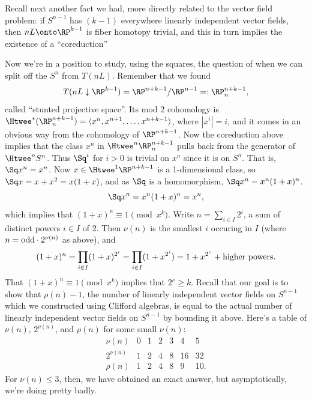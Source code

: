 Recall next another fact we had, more directly related to the vector field problem: if $S^{n-1}$ has $(k-1)$ everywhere linearly independent vector fields, then $nL \onto \RP^{k-1}$ is fiber homotopy trivial, and this in turn implies the existence of a ``coreduction''
Now we're in a position to study, using the squares, the question of when we can split off the $S^n$ from $T(nL)$.  Remember that we found
\[
T(nL\downarrow\RP^{k-1}) = \RP^{n+k-1}/\RP^{n-1} =: \RP^{n+k-1}_n
,\]
called ``stunted projective space''.  Its mod 2 cohomology is $\Htwee^*(\RP^{n+k-1}_n) = \langle x^n, x^{n+1}, \ldots, x^{n+k-1} \rangle$, where $|x^i| = i$, and it comes in an obvious way from the cohomology of $\RP^{n+k-1}$.  Now the coreduction above implies that the class $x^n$ in $\Htwee^n \RP^{n+k-1}_n$ pulls back from the generator of $\Htwee^n S^n$.  Thus $\Sq^i$ for $i > 0$ is trivial on $x^n$ since it is on $S^n$. That is, $\Sq x^n=x^n$.  Now $x \in \Htwee^1 \RP^{n+k-1}$ is a 1-dimensional class, so $\Sq x = x + x^2 = x(1+x)$, and as $\Sq$ is a homomorphism, $\Sq x^n = x^n(1+x)^n$. %
\[
\Sq x^n = x^n(1 + x)^n = x^n
,\]
which implies that $(1+x)^n \equiv 1 \pmod{x^k}$.  Write $n = \sum_{i \in I} 2^i$, a sum of distinct powers $i \in I$ of 2.  Then $\nu(n)$ is the smallest $i$ occuring in $I$ (where $n=\textup{odd}\cdot2^{\nu(n)}$ as above), and
\[
(1+x)^n = \prod_{i \in I} (1 + x)^{2^i} = \prod_{i \in I} (1 + x^{2^i}) = 1 + x^{2^\nu} + \hbox{higher powers}
.\]
That $(1 + x)^n \equiv 1 \pmod{x^k}$ implies that $2^\nu \ge k$.  Recall that our goal is to show that $\rho(n) - 1$, the number of linearly independent vector fields on $S^{n-1}$ which we constructed using Clifford algebras, is equal to the actual number of linearly independent vector fields on $S^{n-1}$ by bounding it above.  Here's a table of $\nu(n)$, $2^{\nu(n)}$, and $\rho(n)$ for some small $\nu(n)$:
\[
\begin{array}{c|cccccc}
\nu(n) & 0 & 1 & 2 & 3 & 4 & 5 \\
\hline
2^{\nu(n)} & 1 & 2 & 4 & 8 & 16 & 32 \\
\rho(n) & 1 & 2 & 4 & 8 & 9 & 10.
\end{array}
\]
For $\nu(n) \le 3$, then, we have obtained an exact answer, but asymptotically, we're doing pretty badly.

